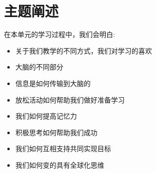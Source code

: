 \chapter{主题阐述}
   在本单元的学习过程中，我们会明白: \par

  \begin{itemize}
    \item 关于我们教学的不同方式，我们对学习的喜欢
    \item 大脑的不同部分
    \item 信息是如何传输到大脑的
    \item 放松活动如何帮助我们做好准备学习
    \item 我们如何提高记忆力
    \item 积极思考如何帮助我们成功
    \item 我们如何互相支持共同实现目标
    \item 我们如何变的具有全球化思维 
  \end{itemize}  

